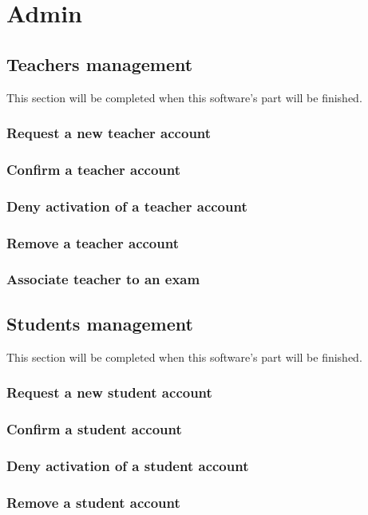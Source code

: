 \documentclass[ManualeUtente]{subfiles}
\begin{document}
\chapter{Admin}

\section{Teachers management}
This section will be completed when this software's part will be finished.
\subsection{Request a new teacher account}
\subsection{Confirm a teacher account}
\subsection{Deny activation of a teacher account}
\subsection{Remove a teacher account}
\subsection{Associate teacher to an exam}

\section{Students management}
This section will be completed when this software's part will be finished.
\subsection{Request a new student account}
\subsection{Confirm a student account}
\subsection{Deny activation of a student account}
\subsection{Remove a student account}
\end{document}
